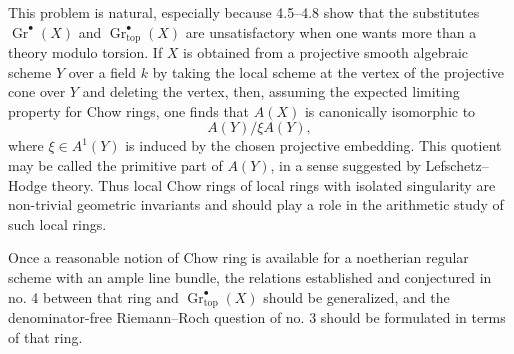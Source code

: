 \documentclass[11pt]{article}
\theoremstyle{plain}
\theoremstyle{definition}
\theoremstyle{remark}
\DeclareMathOperator{\Gr}{Gr}
\providecommand{\topf}{\mathrm{top}}
\begin{document}
This problem is natural, especially because 4.5--4.8 show that the substitutes $\Gr^\bullet(X)$ and $\Gr^\bullet_{\topf}(X)$ are unsatisfactory when one wants more than a theory modulo torsion. If $X$ is obtained from a projective smooth algebraic scheme $Y$ over a field $k$ by taking the local scheme at the vertex of the projective cone over $Y$ and deleting the vertex, then, assuming the expected limiting property for Chow rings, one finds that $A(X)$ is canonically isomorphic to
\[
A(Y)/\xi A(Y),
\]
where $\xi\in A^1(Y)$ is induced by the chosen projective embedding. This quotient may be called the primitive part of $A(Y)$, in a sense suggested by Lefschetz--Hodge theory. Thus local Chow rings of local rings with isolated singularity are non-trivial geometric invariants and should play a role in the arithmetic study of such local rings.

Once a reasonable notion of Chow ring is available for a noetherian regular scheme with an ample line bundle, the relations established and conjectured in no. 4 between that ring and $\Gr^\bullet_{\topf}(X)$ should be generalized, and the denominator-free Riemann--Roch question of no. 3 should be formulated in terms of that ring.
\end{document}
